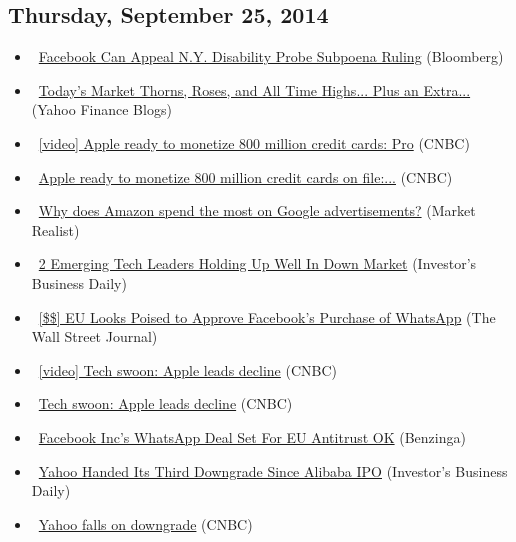 \documentclass[11pt,asymmetric]{article}
\begin{document}
\subsection*{Thursday, September 25, 2014}
\begin{itemize}
\item\ \href{http://www.bloomberg.com/news/2014-09-25/facebook-can-appeal-n-y-disability-probe-subpoena-ruling.html?cmpid=yhoo}{Facebook Can Appeal N.Y. Disability Probe Subpoena Ruling} (Bloomberg)
\item\ \href{http://finance.yahoo.com/tumblr/blog-todays-market-thorns-roses-and-all-time-highs-213948704.html}{Today's Market Thorns, Roses, and All Time Highs... Plus an Extra...} (Yahoo Finance Blogs)
\item\ \href{http://video.cnbc.com/gallery/?video=3000313673&__source=yahoo%7cheadline%7cquote%7cvideo%7c&par=yahoo}{[video] Apple ready to monetize 800 million credit cards: Pro} (CNBC)
\item\ \href{http://finance.yahoo.com/video/apple-looks-good-pro-210300318.html}{Apple ready to monetize 800 million credit cards on file:...} (CNBC)
\item\ \href{http://finance.yahoo.com/news/why-does-amazon-spend-most-210007373.html}{Why does Amazon spend the most on Google advertisements?} (Market Realist)
\item\ \href{http://news.investors.com/092514-719029-palo-alto-networks-arista-networks-show-strength.htm?ven=yahoocp&src=aurlled&ven=yahoo}{2 Emerging Tech Leaders Holding Up Well In Down Market} (Investor's Business Daily)
\item\ \href{http://online.wsj.com/articles/eu-looks-poised-to-approve-facebooks-purchase-of-whatsapp-1411666891?mod=yahoo_hs}{[\$\$] EU Looks Poised to Approve Facebook's Purchase of WhatsApp} (The Wall Street Journal)
\item\ \href{http://video.cnbc.com/gallery/?video=3000313847&__source=yahoo%7cheadline%7cquote%7cvideo%7c&par=yahoo}{[video] Tech swoon: Apple leads decline} (CNBC)
\item\ \href{http://finance.yahoo.com/video/tech-swoon-apple-leads-decline-194600814.html}{Tech swoon: Apple leads decline} (CNBC)
\item\ \href{http://finance.yahoo.com/news/facebook-incs-whatsapp-deal-set-183803835.html}{Facebook Inc's WhatsApp Deal Set For EU Antitrust OK} (Benzinga)
\item\ \href{http://news.investors.com/092514-718970-yahoo-gets-third-downgrade-this-week.htm?ven=yahoocp&src=aurlled&ven=yahoo}{Yahoo Handed Its Third Downgrade Since Alibaba IPO} (Investor's Business Daily)
\item\ \href{http://finance.yahoo.com/video/yahoo-falls-downgrade-165200070.html}{Yahoo falls on downgrade} (CNBC)
\end{itemize}
\end{document}
